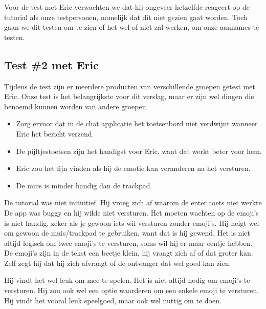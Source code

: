 \documentclass[12pt]{article}
\begin{document}
Voor de test met Eric verwachten we dat hij ongeveer hetzelfde reageert op de tutorial als onze testpersonen, namelijk dat dit niet gezien gaat worden.
Toch gaan we dit testen om te zien of het wel of niet zal werken, om onze aannames te testen.

\subsection{Test \#2 met Eric}

Tijdens de test zijn er meerdere producten van verschillende groepen getest met Eric.
Onze test is het belangrijkste voor dit verslag, maar er zijn wel dingen die benoemd kunnen worden van andere groepen.

\begin{itemize}
	\item Zorg ervoor dat in de chat applicatie het toetsenbord niet verdwijnt wanneer Eric het bericht verzend.
	\item	De pijltjestoetsen zijn het handigst voor Eric, want dat werkt beter voor hem.
	\item Eric zou het fijn vinden als hij de emotie kan veranderen na het versturen.
	\item De muis is minder handig dan de trackpad.
\end{itemize}


De tutorial was niet inituitief.
Hij vroeg zich af waarom de enter toets niet werkte 
De app was buggy en hij wilde niet versturen.
Het moeten wachten op de emoji's is niet handig, zeker als je gewoon iets wil versturen zonder emoji's.
Hij neigt wel om gewoon de muis/trackpad te gebruiken, want dat is hij gewend.
Het is niet altijd logisch om twee emoji's te versturen, soms wil hij er maar eentje hebben.
De emoji's zijn in de tekst een beetje klein, hij vraagt zich af of dat groter kan.
Zelf zegt hij dat hij zich afvraagt of de ontvanger dat wel goed kan zien.

Hij vindt het wel leuk om mee te spelen.
Het is niet altijd nodig om emoji's te versturen.
Hij zou ook wel een optie waarderen om een enkele emoji te versturen.
Hij vindt het vooral leuk speelgoed, maar ook wel nuttig om te doen. 
\end{document}

